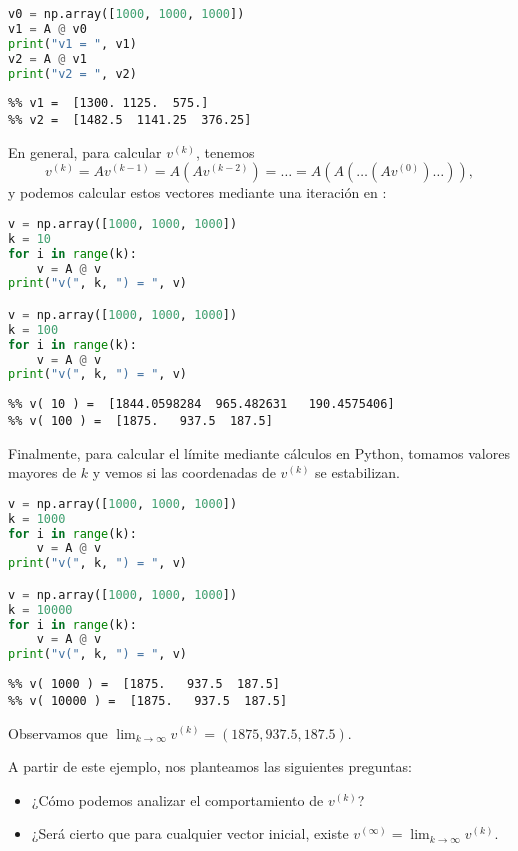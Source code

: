 \begin{ejemplo}
\begin{Shaded}
\begin{lstlisting}[language=python]
v0 = np.array([1000, 1000, 1000])
v1 = A @ v0
print("v1 = ", v1)
v2 = A @ v1
print("v2 = ", v2)
\end{lstlisting}
\end{Shaded}

\begin{verbatim}
%% v1 =  [1300. 1125.  575.]
%% v2 =  [1482.5  1141.25  376.25]
\end{verbatim}

En general, para calcular $v^{(k)}$, tenemos
$$
v^{(k)} = A v^{(k - 1)} = A (A v^{(k-2)}) = \dots = A ( A (\dots ( A v^{(0)})\dots)),
$$
y podemos calcular estos vectores mediante una iteración en \python:

\begin{Shaded}
\begin{lstlisting}[language=python]
v = np.array([1000, 1000, 1000])
k = 10
for i in range(k):
    v = A @ v
print("v(", k, ") = ", v)

v = np.array([1000, 1000, 1000])
k = 100
for i in range(k):
    v = A @ v
print("v(", k, ") = ", v)
\end{lstlisting}
\end{Shaded}

\begin{verbatim}
%% v( 10 ) =  [1844.0598284  965.482631   190.4575406]
%% v( 100 ) =  [1875.   937.5  187.5]
\end{verbatim}

Finalmente, para calcular el límite mediante cálculos en Python, tomamos valores mayores de $k$ y vemos si las coordenadas de $v^{(k)}$ se estabilizan.

\begin{Shaded}
\begin{lstlisting}[language=python]
v = np.array([1000, 1000, 1000])
k = 1000
for i in range(k):
    v = A @ v
print("v(", k, ") = ", v)

v = np.array([1000, 1000, 1000])
k = 10000
for i in range(k):
    v = A @ v
print("v(", k, ") = ", v)
\end{lstlisting}
\end{Shaded}

\begin{verbatim}
%% v( 1000 ) =  [1875.   937.5  187.5]
%% v( 10000 ) =  [1875.   937.5  187.5]
\end{verbatim}

Observamos que $\lim_{k \rightarrow \infty} v^{(k)} = (1875, 937.5, 187.5)$.

A partir de este ejemplo, nos planteamos las siguientes preguntas:
\begin{itemize}
\item ¿Cómo podemos analizar el comportamiento de $v^{(k)}$?
\item ¿Será cierto que para cualquier vector inicial, existe $v^{(\infty)} = \lim_{k \rightarrow \infty} v^{(k)}$.
\end{itemize}


\end{ejemplo}
